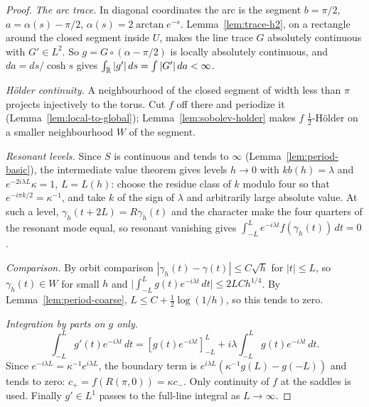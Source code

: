 \begin{proof}
\leanok
\emph{The arc trace.} In diagonal coordinates the arc is the segment $b=\pi/2$,
$a=\alpha(s)-\pi/2$, $\alpha(s)=2\arctan e^{-s}$. Lemma~\ref{lem:trace-h2}, on a
rectangle around the closed segment inside $U$, makes the line trace $G$ absolutely
continuous with $G'\in L^2$. So $g=G\circ(\alpha-\pi/2)$ is locally absolutely continuous,
and $da=ds/\cosh s$ gives $\int_{\mathbb{R}}|g'|\,ds=\int|G'|\,da<\infty$.

\emph{H\"older continuity.} A neighbourhood of the closed segment of width less than
$\pi$ projects injectively to the torus. Cut $f$ off there and periodize it
(Lemma~\ref{lem:local-to-global}); Lemma~\ref{lem:sobolev-holder} makes $f$
$\tfrac12$-H\"older on a smaller neighbourhood $W$ of the segment.

\emph{Resonant levels.} Since $S$ is continuous and tends to $\infty$
(Lemma~\ref{lem:period-basic}), the intermediate value theorem gives levels $h\to0$ with
$kb(h)=\lambda$ and $e^{-2i\lambda L}\kappa=1$, $L=L(h)$: choose the residue
class of $k$ modulo four so that $e^{-i\pi k/2}=\kappa^{-1}$, and take $k$
of the sign of $\lambda$ and arbitrarily large absolute value. At such a
level, $\gamma_h(t+2L)=R\gamma_h(t)$ and the character make the four quarters of the
resonant mode equal, so resonant vanishing gives
$\int_{-L}^{L}e^{-i\lambda t}f(\gamma_h(t))\,dt=0$.

\emph{Comparison.} By orbit comparison $|\gamma_h(t)-\gamma(t)|\le C\sqrt h$ for
$|t|\le L$, so $\gamma_h(t)\in W$ for small $h$ and
$\big|\int_{-L}^{L}g(t)e^{-i\lambda t}\,dt\big|\le 2LC h^{1/4}$. By
Lemma~\ref{lem:period-coarse}, $L\le C+\tfrac12\log(1/h)$, so this tends to zero.

\emph{Integration by parts on $g$ only.}
\[
  \int_{-L}^{L}g'(t)e^{-i\lambda t}\,dt
  =[g(t)e^{-i\lambda t}]_{-L}^{L}
     +i\lambda\int_{-L}^{L}g(t)e^{-i\lambda t}\,dt .
\]
Since $e^{-i\lambda L}=\kappa^{-1}e^{i\lambda L}$, the boundary term is
$e^{i\lambda L}(\kappa^{-1}g(L)-g(-L))$ and tends to zero:
$c_+=f(R(\pi,0))=\kappa c_-$. Only continuity of $f$ at the saddles is used. Finally
$g'\in L^1$ passes to the full-line integral as $L\to\infty$.
\end{proof}

